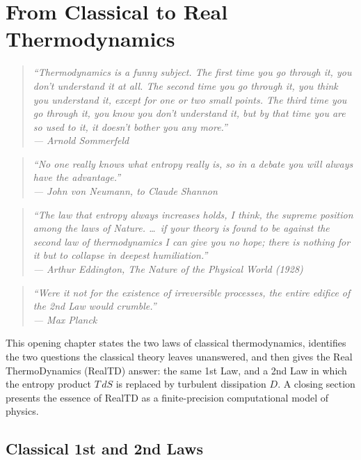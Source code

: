 \chapter{From Classical to Real Thermodynamics}\label{ch:essence}

\begin{quote}\small\itshape
``Thermodynamics is a funny subject. The first time you go through it, you
don't understand it at all. The second time you go through it, you think you
understand it, except for one or two small points. The third time you go
through it, you know you don't understand it, but by that time you are so used
to it, it doesn't bother you any more.''\\
\normalfont\hfill --- Arnold Sommerfeld
\end{quote}

\begin{quote}\small\itshape
``No one really knows what entropy really is, so in a debate you will always
have the advantage.''\\
\normalfont\hfill --- John von Neumann, to Claude Shannon
\end{quote}

\begin{quote}\small\itshape
``The law that entropy always increases holds, I think, the supreme position
among the laws of Nature. \ldots\ if your theory is found to be against the
second law of thermodynamics I can give you no hope; there is nothing for it
but to collapse in deepest humiliation.''\\
\normalfont\hfill --- Arthur Eddington, \emph{The Nature of the Physical World} (1928)
\end{quote}

\begin{quote}\small\itshape
``Were it not for the existence of irreversible processes, the entire edifice
of the 2nd Law would crumble.''\\
\normalfont\hfill --- Max Planck
\end{quote}
\bigskip

This opening chapter states the two laws of classical thermodynamics,
identifies the two questions the classical theory leaves unanswered,
and then gives the Real ThermoDynamics (RealTD) answer: the same 1st
Law, and a 2nd Law in which the entropy product $T\,dS$ is replaced by
turbulent dissipation $D$. A closing section presents the essence of
RealTD as a finite-precision computational model of physics.

\section{Classical 1st and 2nd Laws}\label{sec:classical-laws}

